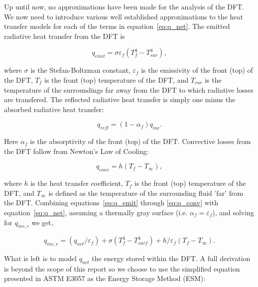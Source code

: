 \documentclass[article]{proc}
\begin{document}
    Up until now, no approximations have been made for the analysis of the DFT. We now need to introduce various well established approximations to the heat transfer models for each of the terms in equation~\ref{eq:q_net}. The emitted radiative heat transfer from the DFT is

    \begin{equation}\label{eq:q_emit}
        q_{emit} = \sigma \varepsilon_f (T_f^4 - T_{sur}^4),
    \end{equation}

    \noindent where $\sigma$ is the Stefan-Boltzman constant, $\varepsilon_f$ is the emissivity of the front (top) of the DFT, $T_f$ is the front (top) temperature of the DFT, and $T_{sur}$ is the temperature of the surroundings far away from the DFT to which radiative losses are transfered. The reflected radiative heat transfer is simply one minus the absorbed radiative heat transfer:

    \begin{equation}\label{eq:q_refl}
        q_{refl} = (1 - \alpha_f)q_{inc}.
    \end{equation}

    \noindent Here $\alpha_f$ is the absorptivity of the front (top) of the DFT. Convective losses from the DFT follow from Newton's Law of Cooling:

    \begin{equation}\label{eq:q_conv}
        q_{conv} = h (T_f - T_{\infty}),
    \end{equation}

    \noindent where $h$ is the heat transfer coefficient, $T_f$ is the front (top) temperature of the DFT, and $T_{\infty}$ is defined as the temperature of the surrounding fluid 'far' from the DFT. Combining equations~\ref{eq:q_emit} through \ref{eq:q_conv} with equation~\ref{eq:q_net}, assuming a thermally gray surface (i.e. $\alpha_f = \varepsilon_f$), and solving for $q_{inc,r}$ we get,

    \begin{equation}\label{eq:q_inc}
        q_{inc,r} = (q_{net}/\varepsilon_f) + \sigma (T_f^4 - T_{surf}^4) + h/\varepsilon_f (T_f - T_{\infty}).
    \end{equation}

    What is left is to model $q_{net}$ the energy stored within the DFT. A full derivation is beyond the scope of this report so we choose to use the simplified equation presented in ASTM E3057 as the Energy Storage Method (ESM):
\end{document}
